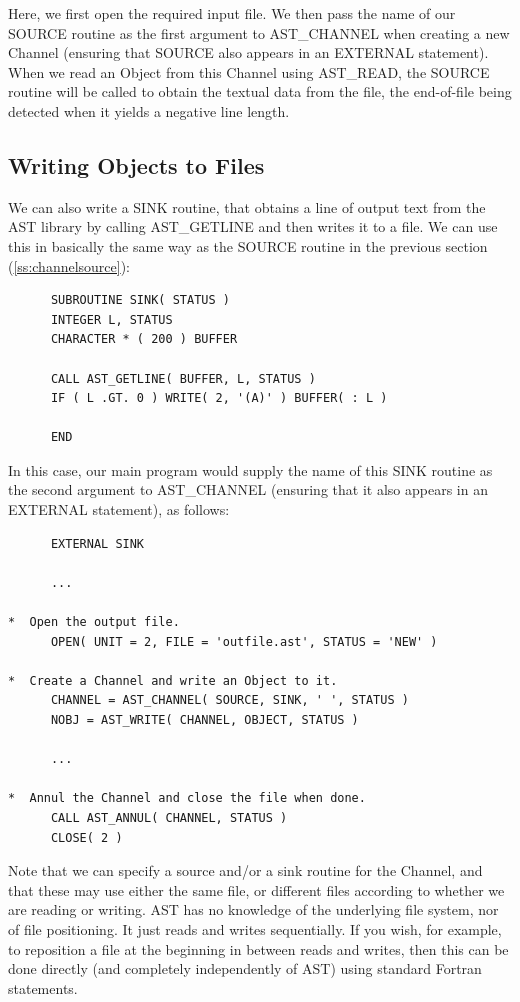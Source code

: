 \documentclass[twoside,11pt]{article}
\newcommand{\htmlref}[2]{#1}
\newcommand{\secref}[1]{\S\ref{#1}}
\renewcommand{\secref}[1]{\ref{#1}}
\begin{document}
Here, we first open the required input file.  We then pass the name of
our SOURCE routine as the first argument to AST\_CHANNEL when creating
a new Channel (ensuring that SOURCE also appears in an EXTERNAL
statement). When we read an \htmlref{Object}{Object} from this Channel using
\htmlref{AST\_READ}{AST_READ}, the SOURCE routine will be called to obtain the textual
data from the file, the end-of-file being detected when it yields a
negative line length.

\subsection{\label{ss:channelsink}Writing Objects to Files}

We can also write a SINK routine, that obtains a line of output text
from the AST library by calling \htmlref{AST\_GETLINE}{AST_GETLINE} and then writes it to a
file. We can use this in basically the same way as the SOURCE routine
in the previous section (\secref{ss:channelsource}):

\small
\begin{verbatim}
      SUBROUTINE SINK( STATUS )
      INTEGER L, STATUS
      CHARACTER * ( 200 ) BUFFER

      CALL AST_GETLINE( BUFFER, L, STATUS )
      IF ( L .GT. 0 ) WRITE( 2, '(A)' ) BUFFER( : L )

      END
\end{verbatim}
\normalsize

In this case, our main program would supply the name of this SINK
routine as the second argument to \htmlref{AST\_CHANNEL}{AST_CHANNEL} (ensuring that it also
appears in an EXTERNAL statement), as follows:

\small
\begin{verbatim}
      EXTERNAL SINK

      ...

*  Open the output file.
      OPEN( UNIT = 2, FILE = 'outfile.ast', STATUS = 'NEW' )

*  Create a Channel and write an Object to it.
      CHANNEL = AST_CHANNEL( SOURCE, SINK, ' ', STATUS )
      NOBJ = AST_WRITE( CHANNEL, OBJECT, STATUS )

      ...

*  Annul the Channel and close the file when done.
      CALL AST_ANNUL( CHANNEL, STATUS )
      CLOSE( 2 )
\end{verbatim}
\normalsize

Note that we can specify a source and/or a sink routine for the
\htmlref{Channel}{Channel}, and that these may use either the same file, or different
files according to whether we are reading or writing. AST has no
knowledge of the underlying file system, nor of file positioning. It
just reads and writes sequentially. If you wish, for example, to
reposition a file at the beginning in between reads and writes, then
this can be done directly (and completely independently of AST) using
standard Fortran statements.
\end{document}
